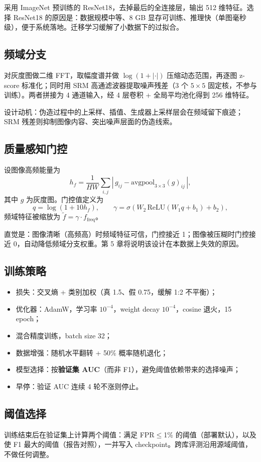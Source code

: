 采用 ImageNet 预训练的 ResNet18，去掉最后的全连接层，输出 512 维特征。选择 ResNet18 的原因是：数据规模中等、8 GB 显存可训练、推理快（单图毫秒级），便于系统落地。迁移学习缓解了小数据下的过拟合。

\subsection{频域分支}

对灰度图做二维 FFT，取幅度谱并做 $\log(1+|\cdot|)$ 压缩动态范围，再逐图 z-score 标准化；同时用 SRM 高通滤波器提取噪声残差（3 个 $5\times5$ 固定核，不参与训练）。两者拼接为 4 通道输入，经 4 层卷积 + 全局平均池化得到 256 维特征。

设计动机：伪造过程中的上采样、插值、生成器上采样层会在频域留下痕迹；SRM 残差则抑制图像内容、突出噪声层面的伪造线索。

\subsection{质量感知门控}

设图像高频能量为
\begin{equation}
  h_f = \frac{1}{HW}\sum_{i,j}\left|\,g_{ij} - \mathrm{avgpool}_{3\times3}(g)_{ij}\,\right|,
\end{equation}
其中 $g$ 为灰度图。门控值定义为
\begin{equation}
  q = \log(1 + 10 h_f), \qquad
  \gamma = \sigma\!\left(W_2\,\mathrm{ReLU}(W_1 q + b_1) + b_2\right),
\end{equation}
频域特征被缩放为 $\tilde{f} = \gamma \cdot f_{\text{freq}}$。

直觉是：图像清晰（高频高）时频域特征可信，门控接近 1；图像被压糊时门控接近 0，自动降低频域分支权重。第 5 章将说明该设计在本数据上失效的原因。

\subsection{训练策略}

\begin{itemize}
  \item 损失：交叉熵 + 类别加权（真 1.5、假 0.75，缓解 1:2 不平衡）；
  \item 优化器：AdamW，学习率 $10^{-4}$，weight decay $10^{-4}$，cosine 退火，15 epoch；
  \item 混合精度训练，batch size 32；
  \item 数据增强：随机水平翻转 + 50\% 概率随机退化；
  \item 模型选择：按\textbf{验证集 AUC}（而非 F1），避免阈值依赖带来的选择噪声；
  \item 早停：验证 AUC 连续 4 轮不涨则停止。
\end{itemize}

\subsection{阈值选择}

训练结束后在验证集上计算两个阈值：满足 FPR$\le$1\% 的阈值（部署默认），以及使 F1 最大的阈值（报告对照），一并写入 checkpoint。跨库评测沿用源域阈值，不做任何调整。
